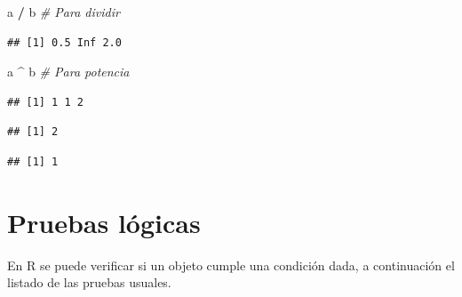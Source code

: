 \documentclass[10pt,]{krantz}
\makeatletter
\newenvironment{Shaded}{\begin{snugshade}}{\end{snugshade}}
\newcommand{\DecValTok}[1]{\textcolor[rgb]{0.00,0.00,0.81}{#1}}
\newcommand{\StringTok}[1]{\textcolor[rgb]{0.31,0.60,0.02}{#1}}
\newcommand{\CommentTok}[1]{\textcolor[rgb]{0.56,0.35,0.01}{\textit{#1}}}
\newcommand{\OperatorTok}[1]{\textcolor[rgb]{0.81,0.36,0.00}{\textbf{#1}}}
\newcommand{\NormalTok}[1]{#1}
\newenvironment{kframe}{%
\medskip{}
\setlength{\fboxsep}{.8em}
 \def\at@end@of@kframe{}%
 \ifinner\ifhmode%
  \def\at@end@of@kframe{\end{minipage}}%
  \begin{minipage}{\columnwidth}%
 \fi\fi%
 \def\FrameCommand##1{\hskip\@totalleftmargin \hskip-\fboxsep
 \colorbox{shadecolor}{##1}\hskip-\fboxsep
     \hskip-\linewidth \hskip-\@totalleftmargin \hskip\columnwidth}%
 \MakeFramed {\advance\hsize-\width
   \@totalleftmargin\z@ \linewidth\hsize
   \@setminipage}}%
 {\par\unskip\endMakeFramed%
 \at@end@of@kframe}
\renewenvironment{Shaded}{\begin{kframe}}{\end{kframe}}
\makeatother
\begin{document}
\begin{Shaded}
\begin{Highlighting}[]
\NormalTok{a }\OperatorTok{/}\StringTok{ }\NormalTok{b  }\CommentTok{# Para dividir}
\end{Highlighting}
\end{Shaded}

\begin{verbatim}
## [1] 0.5 Inf 2.0
\end{verbatim}

\begin{Shaded}
\begin{Highlighting}[]
\NormalTok{a }\OperatorTok{^}\StringTok{ }\NormalTok{b  }\CommentTok{# Para potencia}
\end{Highlighting}
\end{Shaded}

\begin{verbatim}
## [1] 1 1 2
\end{verbatim}

\begin{Shaded}
\end{Shaded}

\begin{verbatim}
## [1] 2
\end{verbatim}

\begin{Shaded}
\end{Shaded}

\begin{verbatim}
## [1] 1
\end{verbatim}

\section{\texorpdfstring{Pruebas lógicas
}{Pruebas lógicas }}\label{pruebas-logicas}

En R se puede verificar si un objeto cumple una condición dada, a
continuación el listado de las pruebas usuales.
\end{document}
